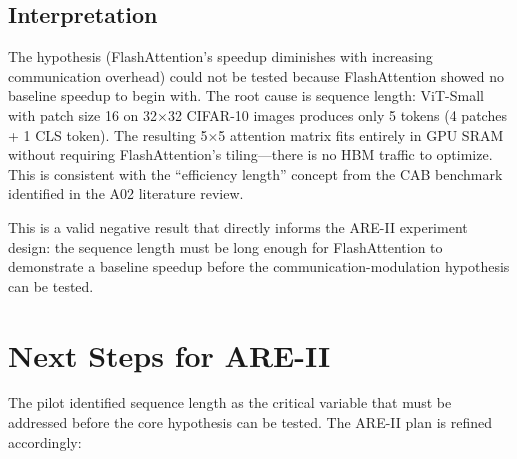 \documentclass[12pt, a4paper]{article}
\begin{document}
\subsection{Interpretation}

The hypothesis (FlashAttention's speedup diminishes with increasing communication overhead) could not be tested because FlashAttention showed no baseline speedup to begin with. The root cause is sequence length: ViT-Small with patch size 16 on 32$\times$32 CIFAR-10 images produces only 5 tokens (4 patches + 1 CLS token). The resulting 5$\times$5 attention matrix fits entirely in GPU SRAM without requiring FlashAttention's tiling---there is no HBM traffic to optimize. This is consistent with the ``efficiency length'' concept from the CAB benchmark identified in the A02 literature review.

This is a valid negative result that directly informs the ARE-II experiment design: the sequence length must be long enough for FlashAttention to demonstrate a baseline speedup before the communication-modulation hypothesis can be tested.

\section{Next Steps for ARE-II}

The pilot identified sequence length as the critical variable that must be addressed before the core hypothesis can be tested. The ARE-II plan is refined accordingly:
\end{document}
